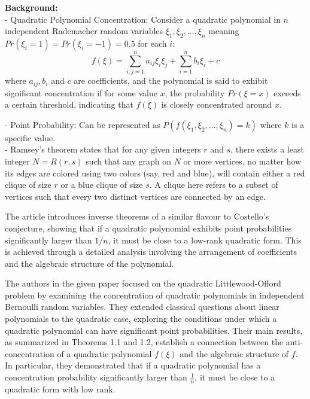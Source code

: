 


\textbf{Background:}\\
- Quadratic Polynomial Concentration: Consider a quadratic polynomial
in ${n}$ independent Rademacher random variables 
${\xi_1, \xi_2,...,\xi_n}$ meaning ${Pr(\xi_i=1)=Pr(\xi_i=-1)=0.5}$ 
for each ${i}$:
$${f(\xi)=\sum_{i,j=1}^{n} a_{ij} \xi_i \xi_j + \sum_{i=1}^{n} b_i \xi_i + c}$$
where ${a_{ij},b_i}$ and ${c}$ are coefficients,
and the polynomial is said to exhibit significant 
concentration if for some value ${x}$, the probability
${Pr(\xi=x)}$ exceeds a certain threshold, indicating 
that ${f(\xi)}$ is closely concentrated around ${x}$.

- Point Probability: Can be represented as ${P(f(\xi_1, \xi_2,...,\xi_n) = k)}$ where ${k}$ is a specific value.\\\newline
- Ramsey's theorem states that for any given integers ${r}$ and ${s}$,
there exists a least integer ${N=R(r,s)}$ 
such that any graph on ${N}$ or more vertices,
no matter how its edges are colored using two colors
(say, red and blue), will contain either a red clique of size ${r}$
or a blue clique of size ${s}$.
A clique here refers to a subset of vertices such that every two distinct
vertices are connected by an edge.

The article introduces inverse theorems of a similar flavour to Costello's
conjecture, showing that if a quadratic polynomial exhibits point
probabilities significantly larger than ${1/n}$,
it must be close to a low-rank quadratic form.
This is achieved through a detailed analysis
involving the arrangement of coefficients
and the algebraic structure of the polynomial.

The authors in the given paper focused on the quadratic
Littlewood-Offord problem by examining the concentration
of quadratic polynomials in independent Bernoulli random
variables. They extended classical questions about linear
polynomials to the quadratic case, exploring the
conditions under which a quadratic polynomial can have
significant point probabilities. Their main results,
as summarized in Theorems 1.1 and 1.2, establish a connection
between the anti-concentration of a quadratic polynomial 
$f(\xi)$ and the algebraic structure of $f$.
In particular,
they demonstrated that if a quadratic polynomial has a 
concentration probability significantly
larger than $\frac{1}{n}$, it must be close to
a quadratic form with low rank.\\\newline

